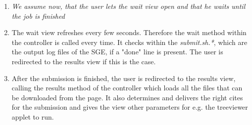 \documentclass{scrartcl}
\begin{document}
\begin{enumerate}
					\item \textit{We assume now, that the user lets the wait view open and that he waits until the job is finished}
					\item The wait view refreshes every few seconds. Therefore the wait method within the controller is called every time. It checks within the \textit{submit.sh.*}, which are the output log files of the SGE, if a "done" line is present. The user is redirected to the results view if this is the case.
					\item After the submission is finished, the user is redirected to the results view, calling the results method of the controller which loads all the files that can be downloaded from the page. It also determines and delivers the right cites for the submission and gives the view other parameters for e.g. the treeviewer applet to run.
				\end{enumerate}
				
\end{document}
